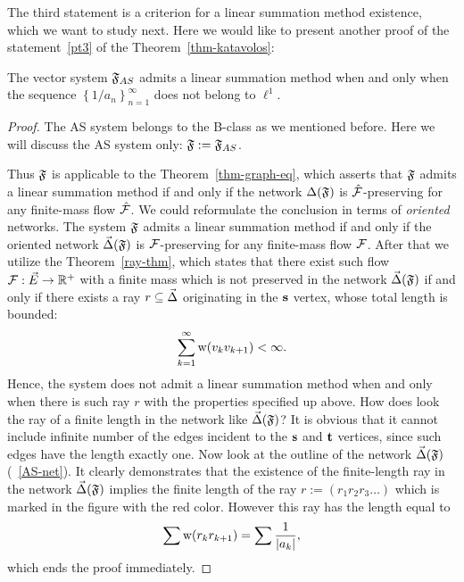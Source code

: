 \documentclass[12pt]{article}
\begin{document}
      The third statement is a criterion for a linear summation method existence, which we want to study next.
      Here we would like to present another proof of the statement~\ref{pt3} of the Theorem~\ref{thm-katavolos}:
      \begin{prop}
          The vector system $\mathfrak{F}_{AS}$ admits a linear summation method when and only when
            the sequence $\left\{1/a_n\right\}_{n=1}^\infty$ does not belong to $\ell^1$.
      \end{prop}
      \begin{proof}
        The AS system belongs to the B-class as we mentioned before.
        Here we will discuss the AS system only: $\mathfrak{F} := \mathfrak{F}_{AS}$.

        Thus $\mathfrak{F}$ is applicable to the Theorem~\ref{thm-graph-eq}, which asserts
          that $\mathfrak{F}$ admits a linear summation method if and only if
          the network $\Delta(\mathfrak{F})$ is $\mathcal{\hat{F}}$-preserving for any
          finite-mass flow $\mathcal{\hat{F}}$.
        We could reformulate the conclusion in terms of \emph{oriented} networks.
        The system $\mathfrak{F}$ admits a linear summation method if and only if
          the oriented network $\vec{\Delta}(\mathfrak{F})$ is $\mathcal{F}$-preserving for any
          finite-mass flow $\mathcal{F}$.
        After that we utilize the Theorem~\ref{ray-thm}, which states that there exist such
          flow $\mathcal{F}: \vec{E} \to \mathbb{R}^{+}$ with a finite mass which is not preserved in
          the network $\vec{\Delta}(\mathfrak{F})$
          if and only if there exists a ray $r \subseteq \vec{\Delta} $ originating in the $\mathbf{s}$ vertex,
          whose total length is bounded:
          \[
            \sum_{k=1}^\infty \mathrm{w}(v_k v_{k+1}) < \infty.
          \]
          Hence, the system does not admit a linear summation method when and only when there is such ray $r$
            with the properties specified up above.
          How does look the ray of a finite length in the network like $\vec{\Delta}(\mathfrak{F})$?
          It is obvious that it cannot include infinite number of the edges incident to the
            $\mathbf{s}$ and $\mathbf{t}$ vertices, since such edges have the length exactly one.
          Now look at the outline of the network $\vec{\Delta}(\mathfrak{F})$ (~\ref{AS-net}).
          It clearly demonstrates that
            the existence of the finite-length ray in the network $\vec{\Delta}(\mathfrak{F})$ implies
            the finite length of the ray $r:=(r_1 r_2 r_3\dots)$ which is marked in the figure with the red color.
          However this ray has the length equal to
          \[
            \sum \mathrm{w}(r_k r_{k+1}) = \sum \frac{1}{|a_k|},
          \]
          which ends the proof immediately.
      \end{proof}
\end{document}
